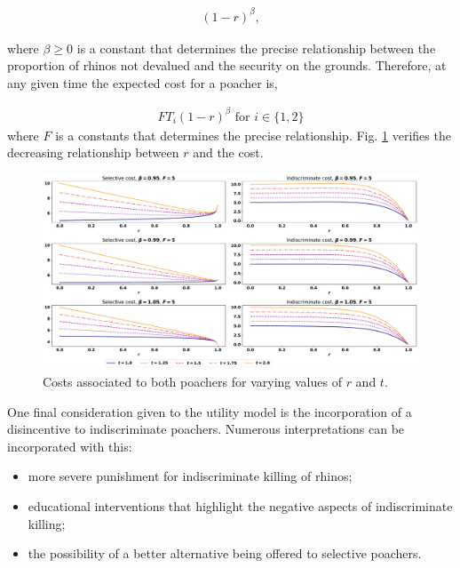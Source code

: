 \documentclass[10pt]{article}
\begin{document}
\begin{eqnarray}
    \label{eqn:risk}
    (1 - r)^{\beta},
\end{eqnarray}

where \(\beta \geq 0\) is a constant that determines the precise relationship
between the proportion of rhinos not devalued and the security on the grounds.
Therefore, at any given time the expected cost for a poacher is,

\begin{eqnarray}
    \label{eqn:cost}
        FT_i(1 - r)^{\beta} \text{ for } i \in \{1, 2\}
\end{eqnarray}
where \(F\) is a constants that determines the precise relationship. Fig.
\ref{fig:CostCurves} verifies the decreasing relationship between \(r\) and the
cost.

\begin{figure}[!htbp]
    \begin{center}
        \includegraphics[width=\linewidth]{images/betas_curve.pdf}
        \caption{Costs associated to both poachers for varying values of \(r\)
        and \(t\).}\label{fig:CostCurves}
    \end{center}
\end{figure}

One final consideration given to the utility model is the incorporation of a
disincentive to indiscriminate poachers. Numerous interpretations can be
incorporated with this:

\begin{itemize}
    \item more severe punishment for indiscriminate killing of rhinos;
    \item educational interventions that highlight the negative aspects of
        indiscriminate killing;
    \item the possibility of a better alternative being offered to selective
        poachers.
\end{itemize}
\end{document}
